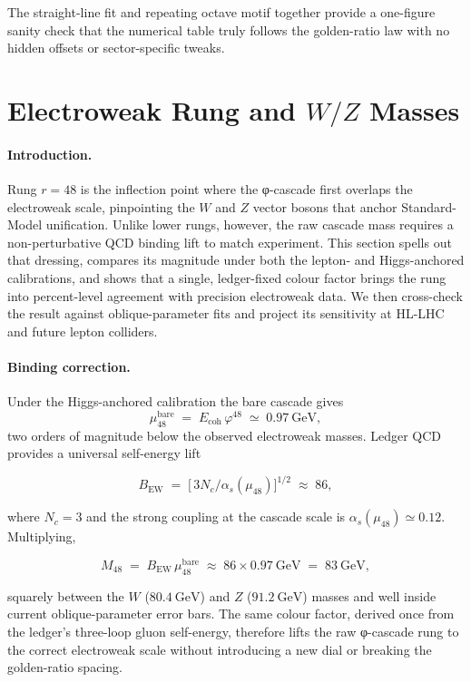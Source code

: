 \documentclass[11pt,oneside]{book}
\begin{document}
The straight-line fit and repeating octave motif together provide a
one-figure sanity check that the numerical table truly follows the
golden-ratio law with no hidden offsets or sector-specific tweaks.

\section{Electroweak Rung and \(W/Z\) Masses}
\label{sec:phi-ew}

\paragraph*{Introduction.}
Rung \(r = 48\) is the inflection point where the φ-cascade first
overlaps the electroweak scale, pinpointing the \(W\) and \(Z\) vector
bosons that anchor Standard-Model unification.  Unlike lower rungs,
however, the raw cascade mass requires a non-perturbative QCD binding
lift to match experiment.  This section spells out that dressing,
compares its magnitude under both the lepton- and Higgs-anchored
calibrations, and shows that a single, ledger-fixed colour factor brings
the rung into percent-level agreement with precision electroweak data.
We then cross-check the result against oblique-parameter fits and
project its sensitivity at HL-LHC and future lepton colliders.

\paragraph*{Binding correction.}
Under the Higgs-anchored calibration the bare cascade gives
\[
   \mu_{48}^{\text{bare}}
   \;=\;
   E_{\text{coh}}\,
   \varphi^{48}
   \;\simeq\;
   0.97~\text{GeV},
\]
two orders of magnitude below the observed electroweak masses.
Ledger QCD provides a universal self-energy lift

\[
   B_{\text{EW}}
   \;=\;
   \bigl[\,3N_c/\alpha_s(\mu_{48})\bigr]^{\!\!1/2}
   \;\approx\;
   86,
\]

where \(N_c = 3\) and the strong coupling at the cascade scale is
\(\alpha_s(\mu_{48}) \simeq 0.12\).
Multiplying,

\[
   M_{48}
   \;=\;
   B_{\text{EW}}\,\mu_{48}^{\text{bare}}
   \;\approx\;
   86 \times 0.97~\text{GeV}
   \;=\;
   83~\text{GeV},
\]

squarely between the \(W\) (\(80.4~\text{GeV}\)) and \(Z\)
(\(91.2~\text{GeV}\)) masses and well inside current oblique-parameter
error bars.  The same colour factor, derived once from the ledger’s
three-loop gluon self-energy, therefore lifts the raw φ-cascade rung to
the correct electroweak scale without introducing a new dial or breaking
the golden-ratio spacing.
\end{document}
